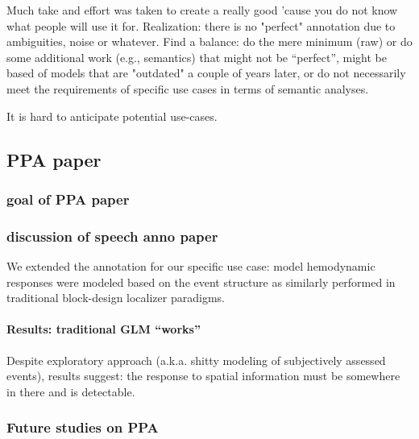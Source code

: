 
%
Much take and effort was taken to create a really good 'cause you do not know
what people will use it for.
%
Realization: there is no "perfect" annotation due to ambiguities, noise or
whatever.
%
Find a balance: do the mere minimum (raw) or do some additional work (e.g.,
semantics) that might not be ``perfect'', might be based of models that are
"outdated" a couple of years later, or do not necessarily meet the
requirements of specific use cases in terms of semantic analyses.

%

%
It is hard to anticipate potential use-cases.



\subsection{PPA paper}

\subsubsection{goal of PPA paper}

\subsubsection{discussion of speech anno paper}


%
We extended the annotation for our specific use case:
%
model hemodynamic responses were modeled based on the event structure as
similarly performed in traditional block-design localizer paradigms.


\paragraph{Results: traditional GLM ``works''}
%
Despite exploratory approach (a.k.a. shitty modeling of subjectively assessed
events), results suggest:
%
the response to spatial information must be somewhere in there and is
detectable.


\subsubsection{Future studies on PPA}

